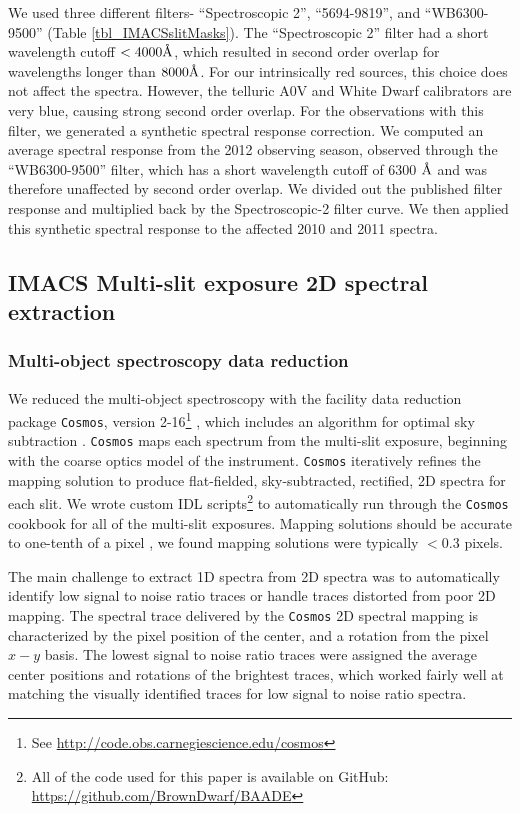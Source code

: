 We used three different filters- ``Spectroscopic 2'', ``5694-9819'', and ``WB6300-9500'' (Table \ref{tbl_IMACSslitMasks}).  The ``Spectroscopic 2'' filter had a short wavelength cutoff $<4000 \mbox{\normalfont\AA}$, which resulted in second order overlap for wavelengths longer than $8000 \mbox{\normalfont\AA}$.  For our intrinsically red sources, this choice does not affect the spectra.  However, the telluric A0V and White Dwarf calibrators are very blue, causing strong second order overlap.  For the observations with this filter, we generated a synthetic spectral response correction.  We computed an average spectral response from the 2012 observing season, observed through the ``WB6300-9500'' filter, which has a short wavelength cutoff of 6300 $\mbox{\normalfont\AA}$ and was therefore unaffected by second order overlap.  We divided out the published filter response and multiplied back by the Spectroscopic-2 filter curve.  We then applied this synthetic spectral response to the affected 2010 and 2011 spectra.

\subsection{IMACS Multi-slit exposure 2D spectral extraction}
\subsubsection{Multi-object spectroscopy data reduction}
We reduced the multi-object spectroscopy with the facility data reduction package \texttt{Cosmos}, version 2-16\footnote{See \url{http://code.obs.carnegiescience.edu/cosmos}} \citep{2011PASP..123..288D}, which includes an algorithm for optimal sky subtraction \citep{2003PASP..115..688K}.  \texttt{Cosmos} maps each spectrum from the multi-slit exposure, beginning with the coarse optics model of the instrument.  \texttt{Cosmos} iteratively refines the mapping solution to produce flat-fielded, sky-subtracted, rectified, 2D spectra for each slit.  We wrote custom IDL scripts\footnote{All of the code used for this paper is available on GitHub: \url{https://github.com/BrownDwarf/BAADE}} to automatically run through the \texttt{Cosmos} cookbook for all of the multi-slit exposures.  Mapping solutions should be accurate to one-tenth of a pixel \citep{2011PASP..123..288D}, we found mapping solutions were typically $<0.3$ pixels.

The main challenge to extract 1D spectra from 2D spectra was to automatically identify low signal to noise ratio traces or handle traces distorted from poor 2D mapping.  The spectral trace delivered by the \texttt{Cosmos} 2D spectral mapping is characterized by the pixel position of the center, and a rotation from the pixel $x-y$ basis.  The lowest signal to noise ratio traces were assigned the average center positions and rotations of the brightest traces, which worked fairly well at matching the visually identified traces for low signal to noise ratio spectra.

